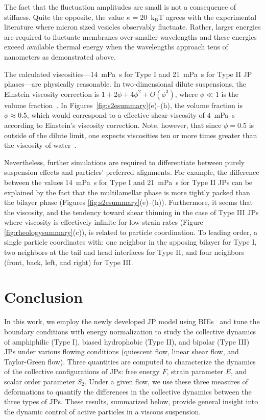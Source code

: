 \documentclass[prb,preprint,showpacs,preprintnumbers,amsmath,amssymb,longbibliography]{revtex4-2}
\newcommand{\kbt}{\mathrm{k}_{\text{B}}\mathrm{T}}
\begin{document}
The fact that the fluctuation amplitudes are small is not a consequence
of stiffness. Quite the opposite, the value $\kappa = 20$~$\kbt$ agrees
with the experimental literature where micron sized vesicles observably
fluctuate. Rather, larger energies are required to fluctuate membranes
over smaller wavelengths and these energies exceed available thermal
energy when the wavelengths approach tens of nanometers as demonstrated
above.

The calculated viscosities---14~mPa~s for Type I and 21~mPa~s for Type
II JP phases---are physically reasonable. In two-dimensional dilute
suspensions, the Einstein viscosity correction is $1 + 2 \phi + 4\phi^2
+ O(\phi^3)$, where $\phi \ll 1$ is the volume
fraction~\cite{PhysRevFluids.1.043301, Haines2011APO, Khair2006TheC,
Brady1983TheEV}. In Figures~\ref{fig:s2esummary}(e)--(h), the volume
fraction is $\phi \approx 0.5$, which would correspond to a effective
shear viscosity of $4$~mPa~s according to Einstein's viscosity
correction. Note, however, that since $\phi = 0.5$ is outside of the
dilute limit, one expects viscosities ten or more times greater than the
viscosity of water~\cite{Konijn2014ExperimentalSO}.

Nevertheless, further simulations are required to differentiate between
purely suspension effects and particles' preferred alignments. For
example, the difference between the values 14~mPa~s for Type I and
21~mPa~s for Type II JPs can be explained by the fact that the
multilamellar phase is more tightly packed than the bilayer phase
(Figures \ref{fig:s2esummary}(e)--(h)). Furthermore, it seems that the
viscosity, and the tendency toward shear thinning in the case of Type
III JPs where viscosity is effectively infinite for low strain rates
(Figure \ref{fig:rheologysummary}(c)), is related to particle
coordination. To leading order, a single particle coordinates with: one
neighbor in the apposing bilayer for Type I, two neighbors at the tail
and head interfaces for Type II, and four neighbors (front, back, left,
and right) for Type III.


\section{Conclusion}
\label{sec:conclusion}

In this work, we employ the newly developed JP model using
BIEs~\cite{Fu20, Fu2022_JFM} and tune the boundary conditions with
energy normalization to study the collective dynamics of amphiphilic
(Type I), biased hydrophobic (Type II), and bipolar (Type III) JPs under
various flowing conditions (quiescent flow, linear shear flow, and
Taylor-Green flow). Three quantities are computed to characterize the
dynamics of the collective configurations of JPs: free energy $F$,
strain parameter $E$, and scalar order parameter $S_2$. 
Under a given flow, we use these three measures of deformations to
quantify the differences in the collective dynamics between the three
types of JPs. These results, summarized below, provide general insight
into the dynamic control of active particles in a viscous suspension.
\end{document}
